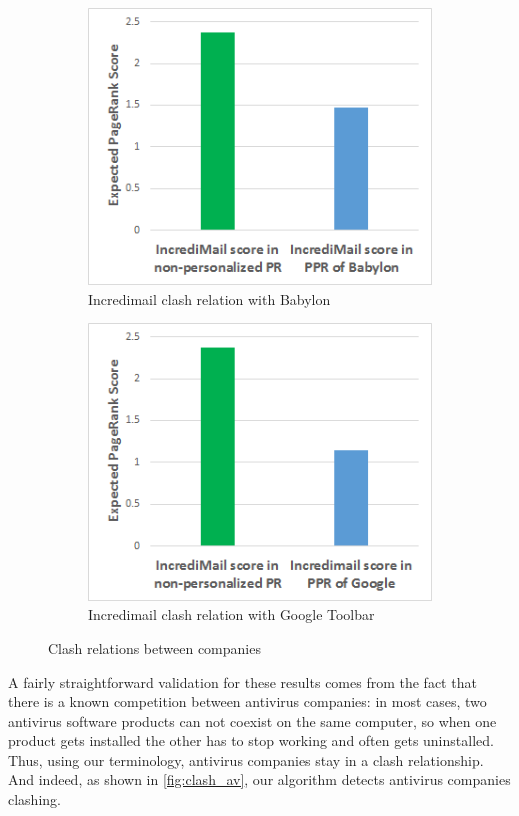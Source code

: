 \documentclass[11pt,oneside]{book}
\begin{document}
\begin{figure}[h]
\centering
\begin{subfigure}[b]{0.8\textwidth}
	\centering
\includegraphics[scale=0.8]{figures/incredi_clash_babylon.png}
\caption{Incredimail clash relation with Babylon}
\label{fig:incredi_clash_babylon}
\end{subfigure}
\begin{subfigure}[b]{0.8\textwidth}
	\centering
\includegraphics[scale=0.8]{figures/incredi_clash_google.png}
\caption{Incredimail clash relation with Google Toolbar}
\label{fig:incredi_clash_google}
\end{subfigure}
\caption{Clash relations between companies}
	\label{fig:clash_2}
\end{figure}

A fairly straightforward validation for these results comes from the fact that there is a known competition between antivirus companies: in most cases, two antivirus software products can not coexist on the same computer, so when one product gets installed the other has to stop working and often gets uninstalled. Thus, using our terminology, antivirus companies stay in a clash relationship. And indeed, as shown in \autoref{fig:clash_av}, our algorithm detects antivirus companies clashing.
\end{document}

